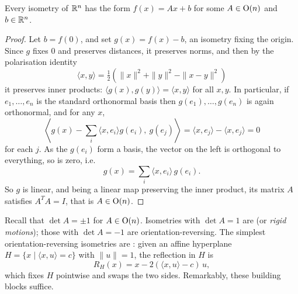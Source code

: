 \documentclass[a4paper]{scrartcl}
\begin{document}
\begin{theorem}
    Every isometry of $\mathbb{R}^n$ has the form $f(x) = Ax + b$ for some $A \in \operatorname{O}(n)$ and $b \in \mathbb{R}^n$.
\end{theorem}
\begin{proof}
    Let $b = f(0)$, and set $g(x) = f(x) - b$, an isometry fixing the origin. Since $g$ fixes $0$ and preserves distances, it preserves norms, and then by the polarisation identity
    $$
    \langle x, y \rangle = \tfrac{1}{2}\left(\|x\|^2 + \|y\|^2 - \|x - y\|^2\right)
    $$
    it preserves inner products: $\langle g(x), g(y) \rangle = \langle x, y \rangle$ for all $x, y$.
    In particular, if $e_1, \dots, e_n$ is the standard orthonormal basis then $g(e_1), \dots, g(e_n)$ is again orthonormal, and for any $x$,
    $$
    \left\langle g(x) - \sum_i \langle x, e_i \rangle g(e_i),\ g(e_j) \right\rangle = \langle x, e_j \rangle - \langle x, e_j \rangle = 0
    $$
    for each $j$. As the $g(e_i)$ form a basis, the vector on the left is orthogonal to everything, so is zero, i.e.
    $$
    g(x) = \sum_i \langle x, e_i \rangle \, g(e_i).
    $$
    So $g$ is linear, and being a linear map preserving the inner product, its matrix $A$ satisfies $A^TA = I$, that is $A \in \operatorname{O}(n)$.
\end{proof}

Recall that $\det A = \pm 1$ for $A \in \operatorname{O}(n)$. Isometries with $\det A = 1$ are  (or \emph{rigid motions}); those with $\det A = -1$ are orientation-reversing. The simplest orientation-reversing isometries are : given an affine hyperplane $H = \{x \mid \langle x, u \rangle = c\}$ with $\|u\| = 1$, the reflection in $H$ is
$$
R_H(x) = x - 2 (\langle x, u \rangle - c)\, u,
$$
which fixes $H$ pointwise and swaps the two sides. Remarkably, these building blocks suffice.
\end{document}
